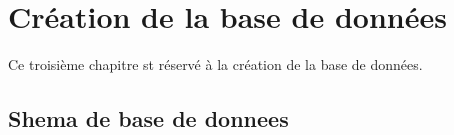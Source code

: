 \chapter{ Création de la base de données}
\vspace{5cm}
\large{Ce troisième chapitre st réservé à la création de la base de données.\\}


\newpage
\section{Shema de base de donnees}

\begin{minipage}{\linewidth}
	\label{f3}%
\end{minipage}\\


